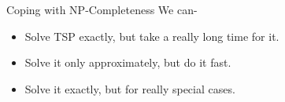 \begin{frame}{Coping with NP-Completeness}
We can-
    \begin{itemize}
    \item<2-4>  Solve TSP exactly, but take a really long time for it.
    \item<3-5> Solve it only approximately, but do it fast.
    \item<4> Solve it exactly, but for really special cases.
    \end{itemize} 
\end{frame}